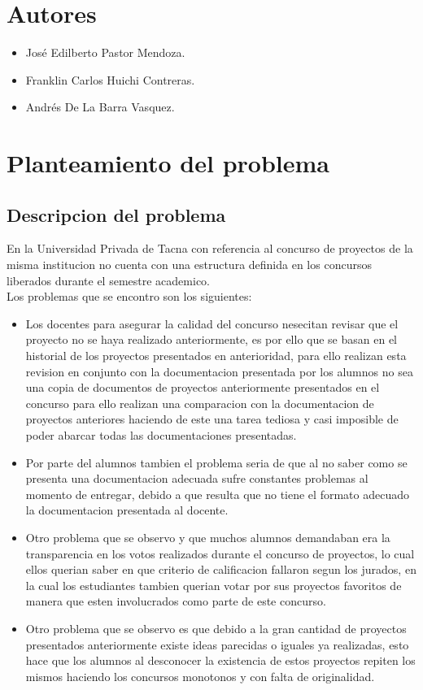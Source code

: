\documentclass[%
 reprint,
 amsmath,amssymb,
 aps,
]{revtex4-1}
\begin{document}
\section{Autores}
\begin{itemize}
\item José Edilberto Pastor Mendoza.
\item Franklin Carlos  Huichi Contreras.
\item Andrés De La Barra Vasquez.
\end{itemize}

\section{Planteamiento del problema}
\subsection{Descripcion del problema}
En la Universidad Privada de Tacna con referencia al concurso de proyectos de la misma institucion no cuenta con una estructura definida en los concursos liberados durante el semestre academico. \\
Los problemas que se encontro son los siguientes:
\begin{itemize}
\item Los docentes para asegurar la calidad del concurso nesecitan revisar que el proyecto no se haya realizado anteriormente, es por ello que se basan en el historial de los proyectos presentados en anterioridad, para ello realizan esta revision en conjunto con la documentacion presentada por los alumnos no sea una copia de documentos de proyectos anteriormente presentados en el concurso para ello realizan una comparacion con la documentacion de proyectos anteriores haciendo de este una tarea tediosa y casi imposible de poder abarcar todas las documentaciones presentadas.
\item  Por parte del alumnos tambien el problema seria de que al no saber como se presenta  una documentacion adecuada sufre constantes problemas al momento de entregar, debido a que resulta que no tiene el formato adecuado la documentacion presentada al docente. 
\item Otro problema que se observo y que muchos alumnos demandaban era la transparencia en los votos realizados durante el concurso de proyectos, lo cual ellos querian saber en que criterio de calificacion fallaron segun los jurados, en la cual los estudiantes tambien querian votar por sus proyectos favoritos de manera que esten involucrados como parte de este concurso.
\item Otro problema que se observo es que debido a la gran cantidad de proyectos presentados anteriormente existe ideas parecidas o iguales ya realizadas, esto hace que los alumnos al desconocer la existencia de estos proyectos repiten los mismos haciendo los concursos monotonos y con falta de originalidad.
\end{itemize}
\end{document}
